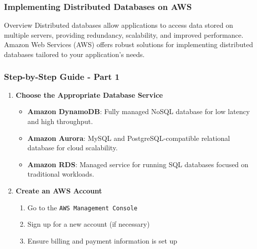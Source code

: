 \documentclass[aspectratio=169]{beamer}
\begin{document}
\begin{frame}[fragile]
    \frametitle{Implementing Distributed Databases on AWS}
    \begin{block}{Overview}
        Distributed databases allow applications to access data stored on multiple servers, providing redundancy, scalability, and improved performance. Amazon Web Services (AWS) offers robust solutions for implementing distributed databases tailored to your application's needs.
    \end{block}
\end{frame}

\begin{frame}[fragile]
    \frametitle{Step-by-Step Guide - Part 1}
    \begin{enumerate}
        \item \textbf{Choose the Appropriate Database Service}
            \begin{itemize}
                \item \textbf{Amazon DynamoDB}: Fully managed NoSQL database for low latency and high throughput.
                \item \textbf{Amazon Aurora}: MySQL and PostgreSQL-compatible relational database for cloud scalability.
                \item \textbf{Amazon RDS}: Managed service for running SQL databases focused on traditional workloads.
            \end{itemize}
        \item \textbf{Create an AWS Account}
            \begin{enumerate}
                \item Go to the \texttt{AWS Management Console}
                \item Sign up for a new account (if necessary)
                \item Ensure billing and payment information is set up
            \end{enumerate}
    \end{enumerate}
\end{frame}
\end{document}

